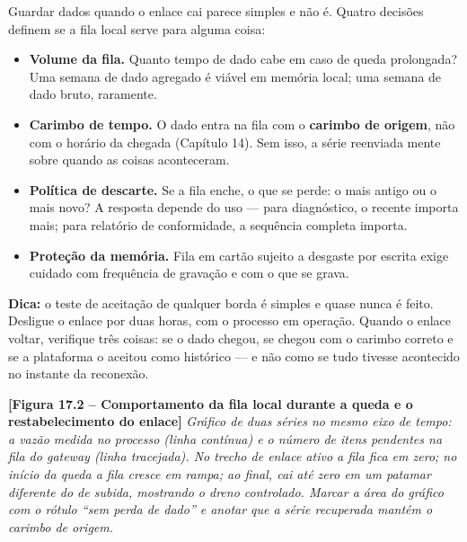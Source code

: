 Guardar dados quando o enlace cai parece simples e não é. Quatro decisões definem se a fila local
serve para alguma coisa:

\begin{itemize}
\tightlist
\item
  \textbf{Volume da fila.} Quanto tempo de dado cabe em caso de queda prolongada? Uma semana de dado
  agregado é viável em memória local; uma semana de dado bruto, raramente.
\item
  \textbf{Carimbo de tempo.} O dado entra na fila com o \textbf{carimbo de origem}, não com o horário da
  chegada (Capítulo 14). Sem isso, a série reenviada mente sobre quando as coisas aconteceram.
\item
  \textbf{Política de descarte.} Se a fila enche, o que se perde: o mais antigo ou o mais novo? A resposta
  depende do uso --- para diagnóstico, o recente importa mais; para relatório de conformidade, a
  sequência completa importa.
\item
  \textbf{Proteção da memória.} Fila em cartão sujeito a desgaste por escrita exige cuidado com
  frequência de gravação e com o que se grava.
\end{itemize}

\begin{caixadica}

\textbf{Dica:} o teste de aceitação de qualquer borda é simples e quase nunca é feito. Desligue o
enlace por duas horas, com o processo em operação. Quando o enlace voltar, verifique três coisas:
se o dado chegou, se chegou com o carimbo correto e se a plataforma o aceitou como histórico --- e
não como se tudo tivesse acontecido no instante da reconexão.

\end{caixadica}

\begin{caixafigura}

\textbf{{[}Figura 17.2 -- Comportamento da fila local durante a queda e o restabelecimento do enlace{]}}
\emph{Gráfico de duas séries no mesmo eixo de tempo: a vazão medida no processo (linha contínua) e o número de itens pendentes na fila do gateway (linha tracejada). No trecho de enlace ativo a fila fica em zero; no início da queda a fila cresce em rampa; ao final, cai até zero em um patamar diferente do de subida, mostrando o dreno controlado. Marcar a área do gráfico com o rótulo ``sem perda de dado'' e anotar que a série recuperada mantém o carimbo de origem.}

\end{caixafigura}

